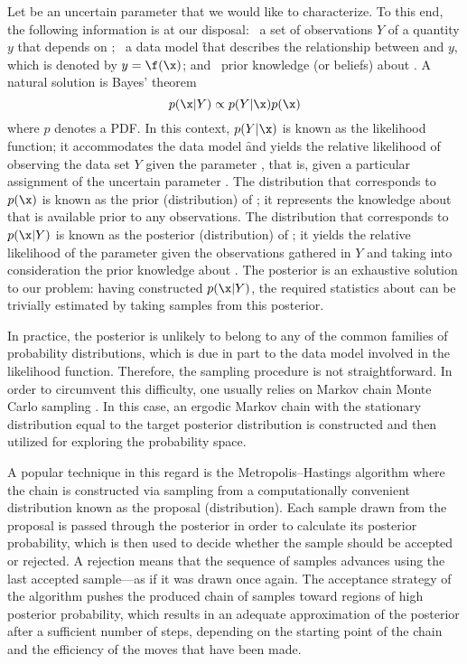 Let \x be an uncertain parameter that we would like to characterize. To this
end, the following information is at our disposal: \one~a set of observations
$Y$ of a quantity $y$ that depends on \x; \two~a data model \f that describes
the relationship between \x and $y$, which is denoted by $y = \f(\x)$; and
\three~prior knowledge (or beliefs) about \x. A natural solution is Bayes'
theorem \cite{gelman2013}
\[
  p(\x | Y) \propto p(Y | \x) p(\x)
\]
where $p$ denotes a \ac{PDF}. In this context, $p(Y | \x)$ is known as the
likelihood function; it accommodates the data model \f and yields the relative
likelihood of observing the data set $Y$ given the parameter \x, that is, given
a particular assignment of the uncertain parameter \x. The distribution that
corresponds to $p(\x)$ is known as the prior (distribution) of \x; it represents
the knowledge about \x that is available prior to any observations. The
distribution that corresponds to $p(\x | Y)$ is known as the posterior
(distribution) of \x; it yields the relative likelihood of the parameter \x
given the observations gathered in $Y$ and taking into consideration the prior
knowledge about \x. The posterior is an exhaustive solution to our problem:
having constructed $p(\x | Y)$, the required statistics about \x can be
trivially estimated by taking samples from this posterior.

In practice, the posterior is unlikely to belong to any of the common families
of probability distributions, which is due in part to the data model involved in
the likelihood function. Therefore, the sampling procedure is not
straightforward. In order to circumvent this difficulty, one usually relies on
Markov chain Monte Carlo sampling \cite{gelman2013}. In this case, an ergodic
Markov chain with the stationary distribution equal to the target posterior
distribution is constructed and then utilized for exploring the probability
space.

A popular technique in this regard is the Metropolis--Hastings algorithm
\cite{gelman2013} where the chain is constructed via sampling from a
computationally convenient distribution known as the proposal (distribution).
Each sample drawn from the proposal is passed through the posterior in order to
calculate its posterior probability, which is then used to decide whether the
sample should be accepted or rejected. A rejection means that the sequence of
samples advances using the last accepted sample---as if it was drawn once again.
The acceptance strategy of the algorithm pushes the produced chain of samples
toward regions of high posterior probability, which results in an adequate
approximation of the posterior after a sufficient number of steps, depending on
the starting point of the chain and the efficiency of the moves that have been
made.
